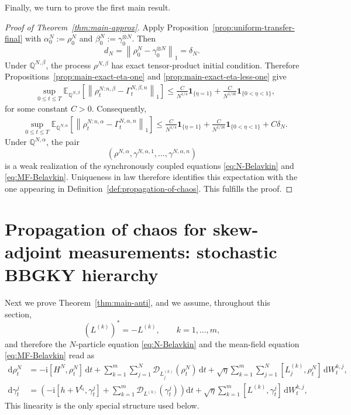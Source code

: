 \documentclass[10pt,a4paper,reqno]{amsart}
\numberwithin{equation}{section}
\theoremstyle{plain}
\theoremstyle{definition}
\theoremstyle{remark}
\renewcommand{\d}{\mathrm d}
\renewcommand{\i}{\mathrm i}
\newcommand{\E}{\mathbb E}
\newcommand{\Q}{\mathbb Q}
\newcommand{\cD}{\mathcal D}
\newcommand{\1}{\mathbf 1}
\begin{document}
Finally,  we turn to prove the first main result.

\begin{proof}[Proof of Theorem~\ref{thm:main-approx}]
Apply Proposition~\ref{prop:uniform-transfer-final} with
\(
  \alpha_0^N:=\rho_0^N\) and 
  \(
  \beta_0^N:=\gamma_0^{\otimes N}.
\)
Then
\[
  d_N
  =
  \left\|
    \rho_0^N-\gamma_0^{\otimes N}
  \right\|_1
  =
  \delta_N.
\]
Under \(\Q^{N,\beta}\), the process
\(\rho^{N,\beta}\) has exact tensor-product initial condition.  Therefore
  Propositions~\ref{prop:main-exact-eta-one} and \ref{prop:main-exact-eta-less-one}  give
\[
\begin{aligned}
  &\sup_{0\le t\le T}
  \E_{\Q^{N,\beta}}
  \left[
    \left\|
      \rho_t^{N:n,\beta}
      -
      \Gamma_t^{N,\beta,n}
    \right\|_1
  \right]\le  \frac{C}{N^{1/4}}{\mathbf 1}_{\{\eta=1\}} + \frac{C}{N^{1/16}}{\mathbf 1}_{\{0<\eta<1\}},
\end{aligned}
\]
for some constant $C>0$.  Consequently,
\[
\begin{aligned}
  &\sup_{0\le t\le T}
  \E_{\Q^{N,\alpha}}
  \left[
    \left\|
      \rho_t^{N:n,\alpha}
      -
      \Gamma_t^{N,\alpha,n}
    \right\|_1
  \right]
  \le
   \frac{C}{N^{1/4}}{\mathbf 1}_{\{\eta=1\}} + \frac{C}{N^{1/16}}{\mathbf 1}_{\{0<\eta<1\}}
  +
  C\delta_N.
\end{aligned}
\]
Under \(\Q^{N,\alpha}\), the pair
\[
  \left(
    \rho^{N,\alpha},
    \gamma^{N,\alpha,1},
    \ldots,
    \gamma^{N,\alpha,n}
  \right)
\]
is a weak realization of the synchronously coupled equations
\eqref{eq:N-Belavkin} and \eqref{eq:MF-Belavkin}.  Uniqueness in law
therefore identifies this expectation with the one appearing in
Definition~\ref{def:propagation-of-chaos}.  This fulfills the proof.
\end{proof}




\section[Skew-adjoint measurements: BBGKY hierarchy]{Propagation of chaos for skew-adjoint measurements: stochastic BBGKY hierarchy}
\label{sec:skew-bbgky}





Next we prove Theorem~\ref{thm:main-anti},  and we assume,  throughout this section,  
\[
  (L^{(k)})^*=-L^{(k)},
  \qquad k=1,\ldots,m,
\]
and therefore the $N$-particle   equation  \eqref{eq:N-Belavkin} and the mean-field equation  \eqref{eq:MF-Belavkin} read as 
\begin{equation}
\begin{aligned}
  \d\rho_t^N
  &=
  -\i[H^N,\rho_t^N]\,\d t
  +
  \sum_{k=1}^m\sum_{j=1}^N
  \cD_{L_j^{(k)}}(\rho_t^N)\,\d t
 +
  \sqrt{\eta}
  \sum_{k=1}^m\sum_{j=1}^N
 [L_j^{(k)},  \rho_t^N] \,\d W_t^{k,j}, \\
   \d\gamma_t^j
 & =
  \left(
    -\i[h+V^{\xi_t},\gamma_t^j]
    +
    \sum_{k=1}^m
    \cD_{L^{(k)}}(\gamma_t^j)
  \right)\d t+
  \sqrt{\eta}
  \sum_{k=1}^m
  [L^{(k)},  \gamma_t^j]\,\d W_t^{k,j},
\end{aligned}
 \end{equation}
This linearity is the only special structure used below.
\end{document}
